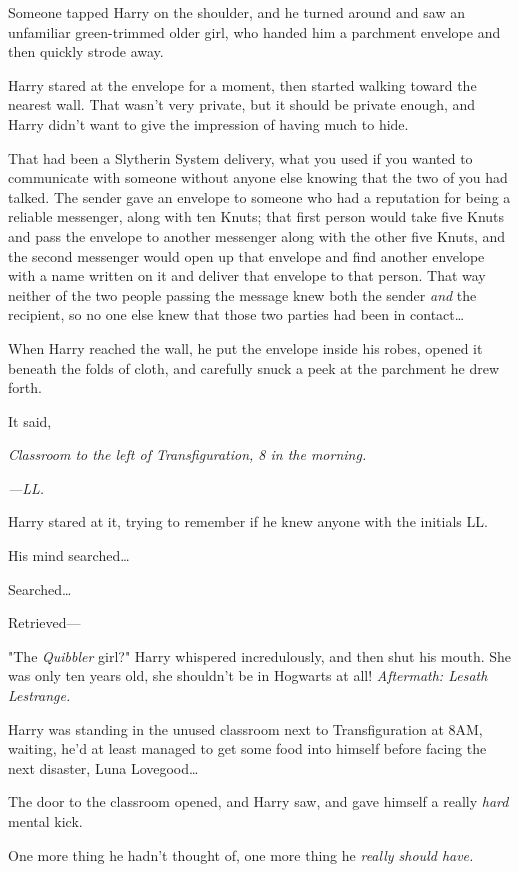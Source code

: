 Someone tapped Harry on the shoulder, and he turned around and saw an 
unfamiliar green-trimmed older girl, who handed him a parchment envelope and 
then quickly strode away.

Harry stared at the envelope for a moment, then started walking toward the 
nearest wall. That wasn't very private, but it should be private enough, and 
Harry didn't want to give the impression of having much to hide.

That had been a Slytherin System delivery, what you used if you wanted to 
communicate with someone without anyone else knowing that the two of you had 
talked. The sender gave an envelope to someone who had a reputation for being a 
reliable messenger, along with ten Knuts; that first person would take five 
Knuts and pass the envelope to another messenger along with the other five 
Knuts, and the second messenger would open up that envelope and find another 
envelope with a name written on it and deliver that envelope to that person. 
That way neither of the two people passing the message knew both the sender 
\emph{and} the recipient, so no one else knew that those two parties had been 
in contact{\ldots}

When Harry reached the wall, he put the envelope inside his robes, opened it 
beneath the folds of cloth, and carefully snuck a peek at the parchment he drew 
forth.

It said,

\emph{Classroom to the left of Transfiguration, 8 in the morning.}

\emph{---LL.}

Harry stared at it, trying to remember if he knew anyone with the initials LL.

His mind searched{\ldots}

Searched{\ldots}

Retrieved---

"The \emph{Quibbler} girl?" Harry whispered incredulously, and then shut his 
mouth. She was only ten years old, she shouldn't be in Hogwarts at all!
\sbreak
\emph{Aftermath: Lesath Lestrange.}

Harry was standing in the unused classroom next to Transfiguration at 8AM, 
waiting, he'd at least managed to get some food into himself before facing the 
next disaster, Luna Lovegood{\ldots}

The door to the classroom opened, and Harry saw, and gave himself a really 
\emph{hard} mental kick.

One more thing he hadn't thought of, one more thing he \emph{really should 
have.}

